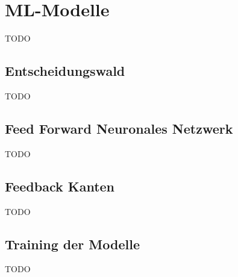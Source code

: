 \chapter{ML-Modelle}
TODO

\section{Entscheidungswald}
TODO

\section{Feed Forward Neuronales Netzwerk}
TODO

\section{Feedback Kanten}
TODO

\section{Training der Modelle}
TODO
